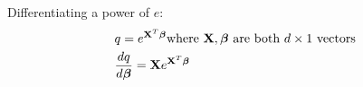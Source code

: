 Differentiating a power of $e$:
\begin {equation} \begin {split}
& q = e^{\mathbf{X}^T \bm{\beta}} \text {where $\mathbf{X}, \bm{\beta}$ are both $d \times 1$ vectors} \\
& \frac {dq} {d \bm{\beta}} = \mathbf{X} e^{\mathbf{X}^T \bm{\beta}} \\
\end {split} \end {equation}

% 
